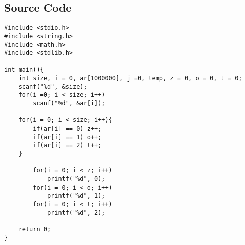 \documentclass{article}
\begin{document}
 \subsection{Source Code}
\begin{verbatim}
#include <stdio.h>
#include <string.h>
#include <math.h>
#include <stdlib.h>

int main(){
    int size, i = 0, ar[1000000], j =0, temp, z = 0, o = 0, t = 0;
    scanf("%d", &size);
    for(i =0; i < size; i++)
        scanf("%d", &ar[i]);
    
    for(i = 0; i < size; i++){
        if(ar[i] == 0) z++;
        if(ar[i] == 1) o++;
        if(ar[i] == 2) t++;
    }
    
        for(i = 0; i < z; i++)
            printf("%d", 0);
        for(i = 0; i < o; i++)
            printf("%d", 1);
        for(i = 0; i < t; i++)
            printf("%d", 2);
    
    return 0;
}
\end{verbatim}
\end{document}
